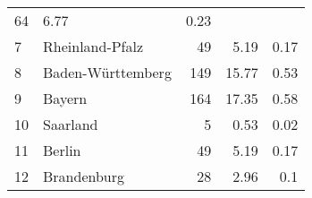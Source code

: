 \begin{longtable}{lXrrr}
       \num{64} &
       \num[round-mode=places,round-precision=2]{6.77} &
         \num[round-mode=places,round-precision=2]{0.23} \\

     7 &
     \multicolumn{1}{X}{ Rheinland-Pfalz   } &


       \num{49} &
       \num[round-mode=places,round-precision=2]{5.19} &
         \num[round-mode=places,round-precision=2]{0.17} \\

     8 &
     \multicolumn{1}{X}{ Baden-Württemberg   } &


       \num{149} &
       \num[round-mode=places,round-precision=2]{15.77} &
         \num[round-mode=places,round-precision=2]{0.53} \\

     9 &
     \multicolumn{1}{X}{ Bayern   } &


       \num{164} &
       \num[round-mode=places,round-precision=2]{17.35} &
         \num[round-mode=places,round-precision=2]{0.58} \\

     10 &
     \multicolumn{1}{X}{ Saarland   } &


       \num{5} &
       \num[round-mode=places,round-precision=2]{0.53} &
         \num[round-mode=places,round-precision=2]{0.02} \\

     11 &
     \multicolumn{1}{X}{ Berlin   } &


       \num{49} &
       \num[round-mode=places,round-precision=2]{5.19} &
         \num[round-mode=places,round-precision=2]{0.17} \\

     12 &
     \multicolumn{1}{X}{ Brandenburg   } &


       \num{28} &
       \num[round-mode=places,round-precision=2]{2.96} &
         \num[round-mode=places,round-precision=2]{0.1} \\


\end{longtable}
